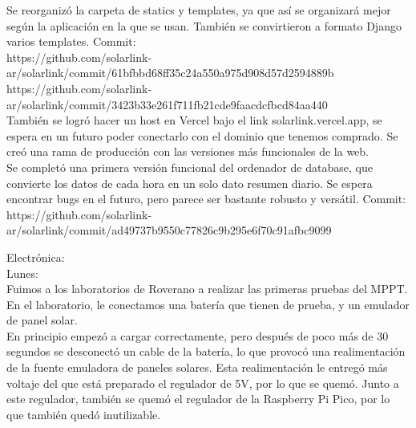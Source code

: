 Se reorganizó la carpeta de statics y templates, ya que así se organizará mejor según la aplicación en la que se usan. También se convirtieron a formato Django varios templates. Commit:\\
https://github.com/solarlink-\\ar/solarlink/commit/61bfbbd68ff35c24a550a975d908d57d2594889b\\

https://github.com/solarlink-\\ar/solarlink/commit/3423b33e261f711fb21cde9faacdcfbcd84aa440\\

También se logró hacer un host en Vercel bajo el link solarlink.vercel.app, se espera en un futuro poder conectarlo con el dominio que tenemos comprado. Se creó una rama de producción con las versiones más funcionales de la web.\\

Se completó una primera versión funcional del ordenador de database, que convierte los datos de cada hora en un solo dato resumen diario. Se espera encontrar bugs en el futuro, pero parece ser bastante robusto y versátil. Commit: \\
https://github.com/solarlink-\\ar/solarlink/commit/ad49737b9550c77826c9b295e6f70c91afbc9099

Electrónica:\\

Lunes:\\

Fuimos a los laboratorios de Roverano a realizar las primeras pruebas del MPPT. \\

En el laboratorio, le conectamos una batería que tienen de prueba, y un emulador de panel solar.\\

En principio empezó a cargar correctamente, pero después de poco más de 30 segundos se desconectó un cable de la batería, lo que provocó una realimentación de la fuente emuladora de paneles solares. Esta realimentación le entregó más voltaje del que está preparado el regulador de 5V, por lo que se quemó. Junto a este regulador, también se quemó el regulador de la Raspberry Pi Pico, por lo que también quedó inutilizable.\\

